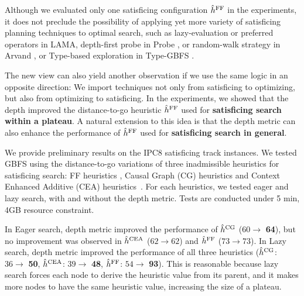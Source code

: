 Although we evaluated only one \sota satisficing configuration $\hat{h}^{\text{FF}}$ in
the experiments, it does not preclude the possibility of applying yet
more variety of satisficing planning techniques to optimal search, such as lazy-evaluation
or preferred operators in LAMA, depth-first probe in Probe \cite{LipovetzkyG11}, or
random-walk strategy in Arvand \cite{nakhost2009monte}, or Type-based
exploration in Type-GBFS \cite{xie14type}.

The new view can also yield another observation if we use the same logic
in an opposite direction: We import techniques not only from satisficing
to optimizing, but also from optimizing to satisficing.
In the experiments, we showed that the depth improved the distance-to-go \ff heuristic $\hat{h}^{\text{FF}}$
used for \textbf{satisficing search within a plateau}. A natural extension
to this idea is that the depth metric can also enhance the performance of
$\hat{h}^{\text{FF}}$ used for \textbf{satisficing search in general}.

We provide preliminary results on the IPC8 satisficing track
instances. We tested GBFS using the distance-to-go variations of three
\sota inadmissible heuristics for satisficing search: FF heuristics
 \cite{Hoffmann01}, Causal Graph (CG) heuristics \cite{Helmert2006} and
Context Enhanced Additive (CEA) heuristics\ \cite{helmert2008unifying}.
For each heuristics, we tested eager and lazy search, with and without
the depth metric.  Tests are conducted under 5 min, 4GB
resource constraint.

In Eager search, depth metric
improved the performance of $\hat{h}^{\text{CG}}$ ($60\rightarrow $ \textbf{64}), but no
improvement was observed in $\hat{h}^{\text{CEA}}$ ($62\rightarrow 62$)
and $\hat{h}^{\text{FF}}$ ($73\rightarrow 73$). In Lazy search, depth metric
improved the performance of all three heuristics
($\hat{h}^{\text{CG}}$: $36\rightarrow $ \textbf{50}, 
 $\hat{h}^{\text{CEA}}$: $39\rightarrow $ \textbf{48}, 
 $\hat{h}^{\text{FF}}$: $54\rightarrow $ \textbf{93}). This is reasonable
because lazy search forces each node to derive the heuristic value from
its parent, and it makes more nodes to have the same heuristic value,
increasing the size of a plateau.

%  

